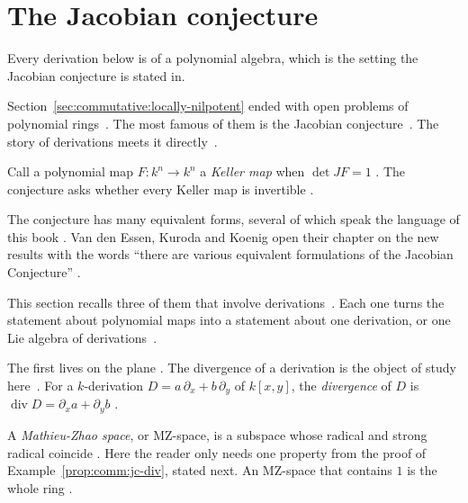 \section{The Jacobian conjecture}\label{sec:commutative:jacobian}

Every derivation below is of a polynomial algebra, which is the setting the
Jacobian conjecture is stated in. %

Section~\ref{sec:commutative:locally-nilpotent} ended with open problems of
polynomial rings~\cite[p.~91]{VanEssenKurodaKoenig2021}. The most famous of them is the Jacobian
conjecture~\cite[p.~91]{VanEssenKurodaKoenig2021}. The story of derivations
meets it directly~\cite[p.~91]{VanEssenKurodaKoenig2021}.

Call a polynomial map $F\colon k^n \to k^n$ a \emph{Keller map} when
$\det JF = 1$ \cite[p.~106]{VanEssenKurodaKoenig2021}. The conjecture asks
whether every Keller map is invertible
\cite[p.~106]{VanEssenKurodaKoenig2021}.

The conjecture has many equivalent forms, several of which speak the language
of this book \cite[p.~91]{VanEssenKurodaKoenig2021}. Van den Essen, Kuroda and
Koenig open their chapter on the new results with the words ``there are
various equivalent formulations of the Jacobian Conjecture''
\cite[p.~91]{VanEssenKurodaKoenig2021}.

This section recalls three of them that involve
derivations~\cite[p.~91]{VanEssenKurodaKoenig2021}. Each one turns the
statement about polynomial maps into a statement about one derivation, or one
Lie algebra of derivations~\cite[p.~91]{VanEssenKurodaKoenig2021}.

The first lives on the plane \cite[Example~5.2.14,
pp.~130--131]{VanEssenKurodaKoenig2021}. The divergence of a derivation is the
object of study here~\cite[p.~130]{VanEssenKurodaKoenig2021}. For a
$k$-derivation $D = a\,\partial_x + b\,\partial_y$ of $k[x, y]$, the
\emph{divergence} of $D$ is $\operatorname{div} D = \partial_x a + \partial_y
b$ \cite[p.~130]{VanEssenKurodaKoenig2021}.

A \emph{Mathieu-Zhao space}, or MZ-space, is a subspace whose radical and
strong radical coincide \cite[Definition~5.2.1,
p.~123]{VanEssenKurodaKoenig2021}. Here the reader only needs one property
from the proof of Example~\ref{prop:comm:jc-div}, stated next. An MZ-space
that contains $1$ is the whole ring \cite[Example~5.2.11,
pp.~129--130]{VanEssenKurodaKoenig2021}.

